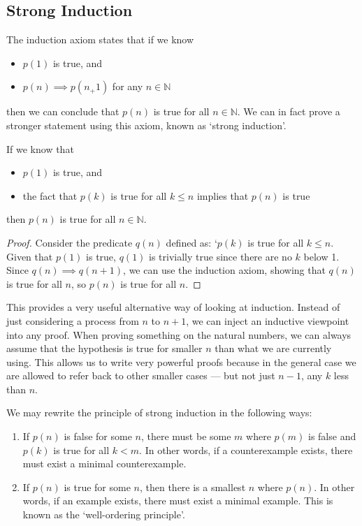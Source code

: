 \documentclass{article}
\begin{document}
	\subsection{Strong Induction}
	The induction axiom states that if we know 
	\begin{itemize}
		\item $p(1)$ is true, and
		\item $p(n) \implies p(n_+1)$ for any $n \in \mathbb N$
	\end{itemize}
	then we can conclude that $p(n)$ is true for all $n \in \mathbb N$. We can in fact prove a stronger statement using this axiom, known as `strong induction'.
	\begin{claim}
		If we know that
		\begin{itemize}
			\item $p(1)$ is true, and
			\item the fact that $p(k)$ is true for all $k\leq n$ implies that $p(n)$ is true
		\end{itemize}
		then $p(n)$ is true for all $n \in \mathbb N$.
	\end{claim}
	\begin{proof}
		Consider the predicate $q(n)$ defined as: `$p(k)$ is true for all $k \leq n$. Given that $p(1)$ is true, $q(1)$ is trivially true since there are no $k$ below 1. Since $q(n) \implies q(n+1)$, we can use the induction axiom, showing that $q(n)$ is true for all $n$, so $p(n)$ is true for all $n$.
	\end{proof}
	This provides a very useful alternative way of looking at induction. Instead of just considering a process from $n$ to $n+1$, we can inject an inductive viewpoint into any proof. When proving something on the natural numbers, we can always assume that the hypothesis is true for smaller $n$ than what we are currently using. This allows us to write very powerful proofs because in the general case we are allowed to refer back to other smaller cases --- but not just $n-1$, any $k$ less than $n$.
	
	We may rewrite the principle of strong induction in the following ways:
	\begin{enumerate}
		\item If $p(n)$ is false for some $n$, there must be some $m$ where $p(m)$ is false and $p(k)$ is true for all $k<m$. In other words, if a counterexample exists, there must exist a minimal counterexample.
		\item If $p(n)$ is true for some $n$, then there is a smallest $n$ where $p(n)$. In other words, if an example exists, there must exist a minimal example. This is known as the `well-ordering principle'.
	\end{enumerate}
\end{document}
